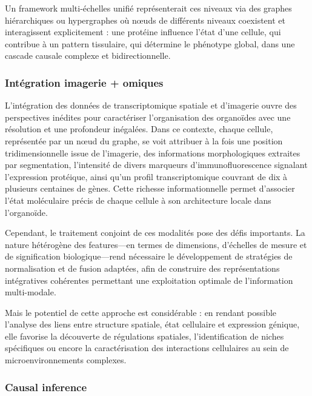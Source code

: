 Un framework multi-échelles unifié représenterait ces niveaux via des graphes hiérarchiques ou hypergraphes où nœuds de différents niveaux coexistent et interagissent explicitement : une protéine influence l'état d'une cellule, qui contribue à un pattern tissulaire, qui détermine le phénotype global, dans une cascade causale complexe et bidirectionnelle.

\subsubsection{Intégration imagerie + omiques}

L’intégration des données de transcriptomique spatiale et d’imagerie ouvre des perspectives inédites pour caractériser l’organisation des organoïdes avec une résolution et une profondeur inégalées. Dans ce contexte, chaque cellule, représentée par un nœud du graphe, se voit attribuer à la fois une position tridimensionnelle issue de l’imagerie, des informations morphologiques extraites par segmentation, l’intensité de divers marqueurs d’immunofluorescence signalant l’expression protéique, ainsi qu’un profil transcriptomique couvrant de dix à plusieurs centaines de gènes. Cette richesse informationnelle permet d’associer l’état moléculaire précis de chaque cellule à son architecture locale dans l’organoïde.

Cependant, le traitement conjoint de ces modalités pose des défis importants. La nature hétérogène des features—en termes de dimensions, d'échelles de mesure et de signification biologique—rend nécessaire le développement de stratégies de normalisation et de fusion adaptées, afin de construire des représentations intégratives cohérentes permettant une exploitation optimale de l'information multi-modale.

Mais le potentiel de cette approche est considérable : en rendant possible l’analyse des liens entre structure spatiale, état cellulaire et expression génique, elle favorise la découverte de régulations spatiales, l’identification de niches spécifiques ou encore la caractérisation des interactions cellulaires au sein de microenvironnements complexes.

\subsubsection{Causal inference}

